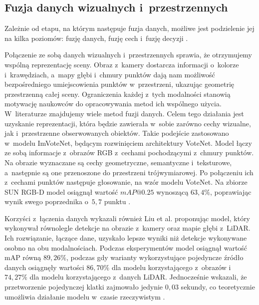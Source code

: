 \subsection{Fuzja danych wizualnych i~przestrzennych}

Zależnie od etapu, na którym następuje fuzja danych, możliwe jest podzielenie jej na kilka poziomów: fuzję danych, fuzję cech i~fuzję decyzji \cite{bib:liu2023lidarcamerafusion}.

Połączenie ze sobą danych wizualnych i~przestrzennych sprawia, że otrzymujemy wspólną reprezentację sceny. Obraz z~kamery dostarcza informacji o~kolorze i~krawędziach, a~mapy głębi i~chmury punktów dają nam możliwość bezpośredniego umiejscowienia punktów w~przestrzeni, ukazując geometrię przestrzenną całej sceny. Ograniczenia każdej z~tych modalności stanowią motywację naukowców do opracowywania metod ich wspólnego użycia. W~literaturze znajdujemy wiele metod fuzji danych. Celem tego działania jest uzyskanie reprezentacji, która będzie zawierała w~sobie zarówno cechy wizualne, jak i~przestrzenne obserwowanych obiektów. Takie podejście zastosowano w~modelu ImVoteNet, będącym rozwinięciem architektury VoteNet. Model łączy ze sobą informacje z~obrazów RGB z~cechami pochodzącymi z~chmury punktów. Na obrazie wyznaczane są cechy geometryczne, semantyczne i~teksturowe, a~następnie są one przenoszone do przestrzeni trójwymiarowej. Po połączeniu ich z~cechami punktów następuje głosowanie, na wzór modelu VoteNet. Na zbiorze SUN RGB-D model osiągnął wartość $mAP@0.25$ wynoszącą $63,4\%$, poprawiając wynik swego poprzednika o~$5,7$ punktu \cite{bib:qi2020imvotenet}.

Korzyści z~łączenia danych wykazali również Liu et al. proponując model, który wykonywał równolegle detekcje na obrazie z~kamery oraz mapie głębi z~LiDAR. Ich rozwiązanie, łączące dane, uzyskało  lepsze wyniki niż detekcje wykonywane osobno na obu modalnościach. Podczas eksperymentów model osiągnął wartość mAP równą $89,26\%$, podczas gdy warianty wykorzystujące pojedyncze źródło danych osiągnęły wartości $86,70\%$ dla modelu korzystającego z~obrazów i~$74,27\%$ dla modelu korzystającego z~danych LiDAR. Jednocześnie wskazali, że przetworzenie pojedynczej klatki zajmowało jedynie $0,03$ sekundy, co teoretycznie umożliwia działanie modelu w~czasie rzeczywistym \cite{bib:liu2023lidarcamerafusion}.

